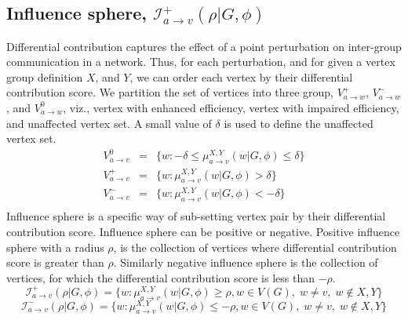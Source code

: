 \documentclass{article}
\begin{document}
\subsection{Influence sphere, $\mathcal{I}^{+}_{a\rightarrow v}(\rho \vert G,\phi)$}\label{sec:inflsph}
Differential contribution captures the effect of a point perturbation on inter-group communication in a network. Thus, for each perturbation, and for given a vertex group definition $X$, and $Y$, we can order each vertex by their differential contribution score. We partition the set of vertices into three group, $V^{+}_{a\rightarrow w}$, $V^{-}_{a\rightarrow w}$, and $V^{0}_{a\rightarrow w}$, viz., vertex with enhanced efficiency, vertex with impaired efficiency, and unaffected vertex set. A small value of $\delta$ is used to define the unaffected vertex set.
\begin{eqnarray*}
    V^{0}_{a\rightarrow v} & = & \lbrace w:  -\delta \leq \mu^{X,Y}_{a \rightarrow v}(w \vert G,\phi) \leq \delta \rbrace  \\
    V^{+}_{a\rightarrow v} & = & \lbrace w:  \mu^{X,Y}_{a \rightarrow v}(w \vert G,\phi) > \delta \rbrace  \\
    V^{-}_{a\rightarrow v} & = & \lbrace w:  \mu^{X,Y}_{a \rightarrow v}(w \vert G,\phi) < -\delta \rbrace  \\
\end{eqnarray*}
Influence sphere is a specific way of sub-setting vertex pair by their differential contribution score. Influence sphere can be positive or negative. Positive influence sphere with a radius $\rho$, is the collection of vertices where differential contribution score is greater than $\rho$. Similarly negative influence sphere is the collection of vertices, for which the differential contribution score is less than $-\rho$.
\begin{equation*}
    \mathcal{I}^{+}_{a\rightarrow v}(\rho \vert G,\phi) = \Big\lbrace w : \mu^{X,Y}_{a \rightarrow v}(w \vert G,\phi) \geq \rho, w \in V(G),\; w \neq v,\; w \notin X,Y \Big\rbrace
\end{equation*}
\begin{equation*}
    \mathcal{I}^{-}_{a\rightarrow v}(\rho \vert G,\phi) = \Big\lbrace w : \mu^{X,Y}_{a \rightarrow v}(w \vert G,\phi) \leq -\rho, w \in V(G),\; w \neq v,\; w \notin X,Y \Big\rbrace
\end{equation*}
\end{document}

